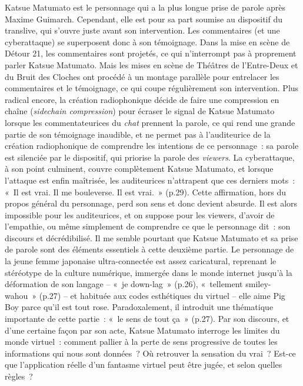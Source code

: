 \documentclass[
]{article}
\begin{document}
Katsue Matumato est le personnage qui a la plus longue prise de parole après Maxime Guimarch. Cependant, elle est pour sa part soumise au dispositif du translive, qui s'ouvre juste avant son intervention. Les commentaires (et une cyberattaque) se superposent donc à son témoignage. Dans la mise en scène de Détour 21, les commentaires sont projetés, ce qui n'interrompt pas à proprement parler Katsue Matumato. Mais les mises en scène de Théâtres de l'Entre-Deux et du Bruit des Cloches ont procédé à un montage parallèle pour entrelacer les commentaires et le témoignage, ce qui coupe régulièrement son intervention. Plus radical encore, la création radiophonique décide de faire une compression en chaîne (\emph{sidechain compression}) pour écraser le signal de Katsue Matumato lorsque les commentateurices du \emph{chat }prennent la parole, ce qui rend une grande partie de son témoignage inaudible, et ne permet pas à l'auditeurice de la création radiophonique de comprendre les intentions de ce personnage~: sa parole est silenciée par le dispositif, qui priorise la parole des \emph{viewers}. La cyberattaque, à son point culminent, couvre complètement Katsue Matumato, et lorsque l'attaque est enfin maîtrisée, les auditeurices n'attrapent que ces derniers mots~: «~Il est vrai. Il me bouleverse. Il est vrai.~» (p.29). Cette affirmation, hors du propos général du personnage, perd son sens et donc devient absurde. Il est alors impossible pour les auditeurices, et on suppose pour les viewers, d'avoir de l'empathie, ou même simplement de comprendre ce que le personnage dit~: son discours et décrédibilisé. Il me semble pourtant que Katsue Matumato et sa prise de parole sont des éléments essentiels à cette deuxième partie. Le personnage de la jeune femme japonaise ultra-connectée est assez caricatural, reprenant le stéréotype de la culture numérique, immergée dans le monde internet jusqu'à la déformation de son langage -- «~je down-lag~» (p.26), «~tellement smiley-wahou~» (p.27) -- et habituée aux codes esthétiques du virtuel -- elle aime Pig Boy parce qu'il est tout rose. Paradoxalement, il introduit une thématique importante de cette partie~: «~le sens de tout ça~» (p.27). Par son discours, et d'une certaine façon par son acte, Katsue Matumato interroge les limites du monde virtuel~: comment pallier à la perte de sens progressive de toutes les informations qui nous sont données~? Où retrouver la sensation du vrai~? Est-ce que l'application réelle d'un fantasme virtuel peut être jugée, et selon quelles règles~?
\end{document}
